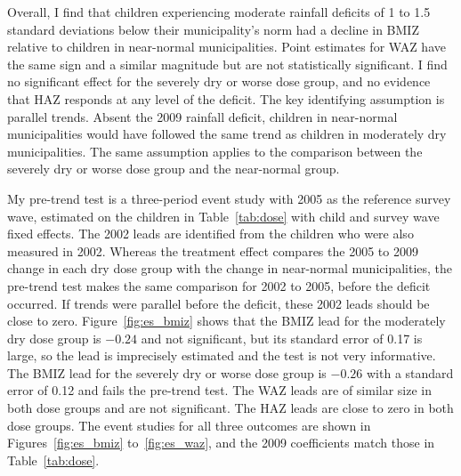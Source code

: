 \documentclass[12pt]{article}
\begin{document}
Overall, I find that children experiencing moderate rainfall deficits of 1 to 1.5 standard deviations below their municipality's norm had a decline in BMIZ relative to children in near-normal municipalities. Point estimates for WAZ have the same sign and a similar magnitude but are not statistically significant. I find no significant effect for the severely dry or worse dose group, and no evidence that HAZ responds at any level of the deficit. The key identifying assumption is parallel trends. Absent the 2009 rainfall deficit, children in near-normal municipalities would have followed the same trend as children in moderately dry municipalities. The same assumption applies to the comparison between the severely dry or worse dose group and the near-normal group.

My pre-trend test is a three-period event study with 2005 as the reference survey wave, estimated on the children in Table~\ref{tab:dose} with child and survey wave fixed effects. The 2002 leads are identified from the children who were also measured in 2002. Whereas the treatment effect compares the 2005 to 2009 change in each dry dose group with the change in near-normal municipalities, the pre-trend test makes the same comparison for 2002 to 2005, before the deficit occurred. If trends were parallel before the deficit, these 2002 leads should be close to zero. Figure~\ref{fig:es_bmiz} shows that the BMIZ lead for the moderately dry dose group is $-0.24$ and not significant, but its standard error of 0.17 is large, so the lead is imprecisely estimated and the test is not very informative. The BMIZ lead for the severely dry or worse dose group is $-0.26$ with a standard error of 0.12 and fails the pre-trend test. The WAZ leads are of similar size in both dose groups and are not significant. The HAZ leads are close to zero in both dose groups. The event studies for all three outcomes are shown in Figures~\ref{fig:es_bmiz} to~\ref{fig:es_waz}, and the 2009 coefficients match those in Table~\ref{tab:dose}.
\end{document}
